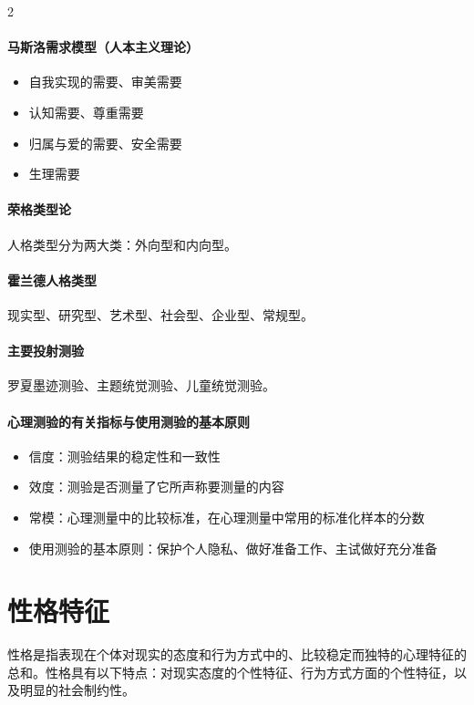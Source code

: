 \documentclass[b5paper,11pt]{article}
\begin{document}
\begingroup
{}
\setlength{\columnsep}{1em}
\begin{paracol}{2}

  \paragraph{马斯洛需求模型（人本主义理论）}
  \begin{itemize}
    \item 自我实现的需要、审美需要
    \item 认知需要、尊重需要
    \item 归属与爱的需要、安全需要
    \item 生理需要
  \end{itemize}

  \switchcolumn

  \paragraph{荣格类型论} 人格类型分为两大类：外向型和内向型。
  \paragraph{霍兰德人格类型} 现实型、研究型、艺术型、社会型、企业型、常规型。
  \paragraph{主要投射测验} 罗夏墨迹测验、主题统觉测验、儿童统觉测验。
\end{paracol}
\endgroup

\paragraph{心理测验的有关指标与使用测验的基本原则}
\begin{itemize}
  \item \textcolor{ctp-red}{信度}：测验结果的稳定性和一致性
  \item \textcolor{ctp-red}{效度}：测验是否测量了它所声称要测量的内容
  \item \textcolor{ctp-red}{常模}：心理测量中的比较标准，在心理测量中常用的标准化样本的分数
  \item 使用测验的基本原则：保护个人隐私、做好准备工作、主试做好充分准备
\end{itemize}

\section{性格特征}
性格是指表现在个体对现实的态度和行为方式中的、比较稳定而独特的心理特征的总和。性格具有以下特点：对现实态度的个性特征、行为方式方面的个性特征，以及明显的社会制约性。
\end{document}
